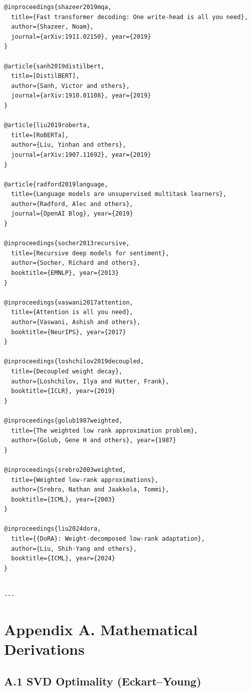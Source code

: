 \begin{lstlisting}
@inproceedings{shazeer2019mqa,
  title={Fast transformer decoding: One write-head is all you need},
  author={Shazeer, Noam},
  journal={arXiv:1911.02150}, year={2019}
}

@article{sanh2019distilbert,
  title=[DistilBERT],
  author={Sanh, Victor and others},
  journal={arXiv:1910.01108}, year={2019}
}

@article{liu2019roberta,
  title=[RoBERTa],
  author={Liu, Yinhan and others},
  journal={arXiv:1907.11692}, year={2019}
}

@article{radford2019language,
  title={Language models are unsupervised multitask learners},
  author={Radford, Alec and others},
  journal={OpenAI Blog}, year={2019}
}

@inproceedings{socher2013recursive,
  title={Recursive deep models for sentiment},
  author={Socher, Richard and others},
  booktitle={EMNLP}, year={2013}
}

@inproceedings{vaswani2017attention,
  title={Attention is all you need},
  author={Vaswani, Ashish and others},
  booktitle={NeurIPS}, year={2017}
}

@inproceedings{loshchilov2019decoupled,
  title={Decoupled weight decay},
  author={Loshchilov, Ilya and Hutter, Frank},
  booktitle={ICLR}, year={2019}
}

@inproceedings{golub1987weighted,
  title={The weighted low rank approximation problem},
  author={Golub, Gene H and others}, year={1987}
}

@inproceedings{srebro2003weighted,
  title={Weighted low-rank approximations},
  author={Srebro, Nathan and Jaakkola, Tommi},
  booktitle={ICML}, year={2003}
}

@inproceedings{liu2024dora,
  title={{DoRA}: Weight-decomposed low-rank adaptation},
  author={Liu, Shih-Yang and others},
  booktitle={ICML}, year={2024}
}
\end{lstlisting}
\begin{lstlisting}

---
\end{lstlisting}


\section{Appendix A. Mathematical Derivations}

\subsection{A.1 SVD Optimality (Eckart--Young)}

